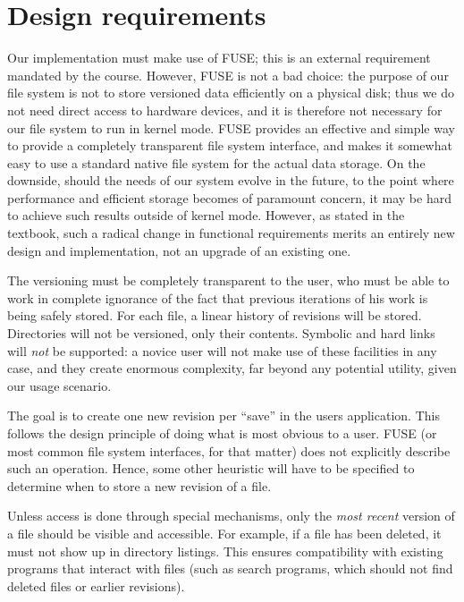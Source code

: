 \documentclass[12pt]{article}
\begin{document}
\section{Design requirements}

Our implementation must make use of FUSE; this is an external
requirement mandated by the course.  However, FUSE is not a bad
choice: the purpose of our file system is not to store versioned data
efficiently on a physical disk; thus we do not need direct access to
hardware devices, and it is therefore not necessary for our file
system to run in kernel mode.  FUSE provides an effective and simple
way to provide a completely transparent file system interface, and
makes it somewhat easy to use a standard native file system for the
actual data storage.  On the downside, should the needs of our system
evolve in the future, to the point where performance and efficient
storage becomes of paramount concern, it may be hard to achieve such
results outside of kernel mode.  However, as stated in the textbook,
such a radical change in functional requirements merits an entirely
new design and implementation, not an upgrade of an existing one.

The versioning must be completely transparent to the user, who must be
able to work in complete ignorance of the fact that previous
iterations of his work is being safely stored.  For each file, a
linear history of revisions will be stored.  Directories will not be
versioned, only their contents.  Symbolic and hard links will
\textit{not} be supported: a novice user will not make use of these
facilities in any case, and they create enormous complexity, far
beyond any potential utility, given our usage scenario.

The goal is to create one new revision per ``save'' in the users
application.  This follows the design principle of doing what is most
obvious to a user.  FUSE (or most common file system interfaces, for
that matter) does not explicitly describe such an operation.  Hence,
some other heuristic will have to be specified to determine when to
store a new revision of a file.

Unless access is done through special mechanisms, only the
\textit{most recent} version of a file should be visible and
accessible.  For example, if a file has been deleted, it must not show
up in directory listings.  This ensures compatibility with existing
programs that interact with files (such as search programs, which
should not find deleted files or earlier revisions).
\end{document}
